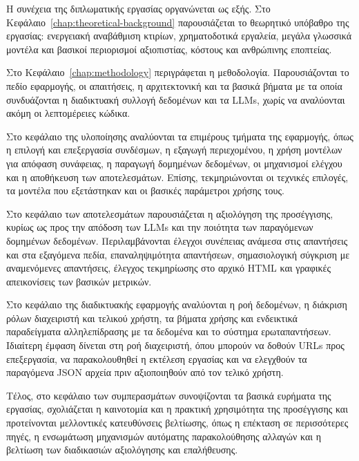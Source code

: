 Η συνέχεια της διπλωματικής εργασίας οργανώνεται ως εξής. Στο
Κεφάλαιο~\ref{chap:theoretical-background} παρουσιάζεται το θεωρητικό υπόβαθρο
της εργασίας: ενεργειακή αναβάθμιση κτιρίων, χρηματοδοτικά εργαλεία, μεγάλα
γλωσσικά μοντέλα και βασικοί περιορισμοί αξιοπιστίας, κόστους και ανθρώπινης
εποπτείας.

Στο Κεφάλαιο~\ref{chap:methodology} περιγράφεται η μεθοδολογία. Παρουσιάζονται
το πεδίο εφαρμογής, οι απαιτήσεις, η αρχιτεκτονική και τα βασικά βήματα με τα
οποία συνδυάζονται η διαδικτυακή συλλογή δεδομένων και τα LLMs, χωρίς να
αναλύονται ακόμη οι λεπτομέρειες κώδικα.

Στο κεφάλαιο της υλοποίησης αναλύονται τα επιμέρους τμήματα της εφαρμογής,
όπως η επιλογή και επεξεργασία συνδέσμων, η εξαγωγή περιεχομένου, η χρήση
μοντέλων για απόφαση συνάφειας, η παραγωγή δομημένων δεδομένων, οι μηχανισμοί
ελέγχου και η αποθήκευση των αποτελεσμάτων. Επίσης, τεκμηριώνονται οι τεχνικές
επιλογές, τα μοντέλα που εξετάστηκαν και οι βασικές παράμετροι χρήσης τους.

Στο κεφάλαιο των αποτελεσμάτων παρουσιάζεται η αξιολόγηση της προσέγγισης,
κυρίως ως προς την απόδοση των LLMs και την ποιότητα των παραγόμενων δομημένων
δεδομένων. Περιλαμβάνονται έλεγχοι συνέπειας ανάμεσα στις απαντήσεις και στα
εξαγόμενα πεδία, επαναληψιμότητα απαντήσεων, σημασιολογική σύγκριση με
αναμενόμενες απαντήσεις, έλεγχος τεκμηρίωσης στο αρχικό HTML και γραφικές
απεικονίσεις των βασικών μετρικών.

Στο κεφάλαιο της διαδικτυακής εφαρμογής αναλύονται η ροή δεδομένων, η
διάκριση ρόλων διαχειριστή και τελικού χρήστη, τα βήματα χρήσης και ενδεικτικά
παραδείγματα αλληλεπίδρασης με τα δεδομένα και το σύστημα ερωταπαντήσεων.
Ιδιαίτερη έμφαση δίνεται στη ροή διαχειριστή, όπου μπορούν να δοθούν URLs προς
επεξεργασία, να παρακολουθηθεί η εκτέλεση εργασίας και να ελεγχθούν τα
παραγόμενα JSON αρχεία πριν αξιοποιηθούν από τον τελικό χρήστη.

Τέλος, στο κεφάλαιο των συμπερασμάτων συνοψίζονται τα βασικά ευρήματα της
εργασίας, σχολιάζεται η καινοτομία και η πρακτική χρησιμότητα της προσέγγισης
και προτείνονται μελλοντικές κατευθύνσεις βελτίωσης, όπως η επέκταση σε
περισσότερες πηγές, η ενσωμάτωση μηχανισμών αυτόματης παρακολούθησης αλλαγών
και η βελτίωση των διαδικασιών αξιολόγησης και επαλήθευσης.
